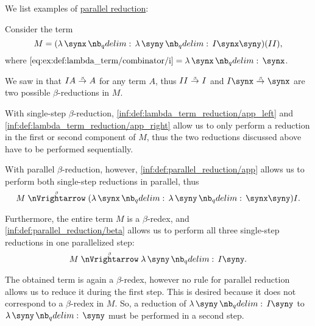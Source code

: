 \begin{example}\label{ex:def:parallel_reduction}
  We list examples of \hyperref[def:parallel_reduction]{parallel reduction}:
  \begin{thmenum}
     Consider the term
    \begin{equation*}
      M = (\qabs \synx \qabs \syny I \synx \syny)(I I),
    \end{equation*}
    where \( \ref{eq:ex:def:lambda_term/combinator/i} = \qabs \synx \synx \).

    We saw in  that \( I A \bred A \) for any term \( A \), thus \( I I \bred I \) and \( I \synx \bred \synx \) are two possible \( \beta \)-reductions in \( M \).

    With single-step \( \beta \)-reduction, \ref{inf:def:lambda_term_reduction/app_left} and \ref{inf:def:lambda_term_reduction/app_right} allow us to only perform a reduction in the first or second component of \( M \), thus the two reductions discussed above have to be performed sequentially.

    With parallel \( \beta \)-reduction, however, \ref{inf:def:parallel_reduction/app} allows us to perform both single-step reductions in parallel, thus
    \begin{equation*}
      M \pbred (\qabs \synx \qabs \syny \synx \syny) I.
    \end{equation*}

    Furthermore, the entire term \( M \) is a \( \beta \)-redex, and \ref{inf:def:parallel_reduction/beta} allows us to perform all three single-step reductions in one parallelized step:
    \begin{equation*}
      M \pbred \qabs \syny I \syny.
    \end{equation*}

    The obtained term is again a \( \beta \)-redex, however no rule for parallel reduction allows us to reduce it during the first step. This is desired because it does not correspond to a \( \beta \)-redex in \( M \). So, a reduction of \( \qabs \syny I \syny \) to \( \qabs \syny \syny \) must be performed in a second step.
  \end{thmenum}
\end{example}

